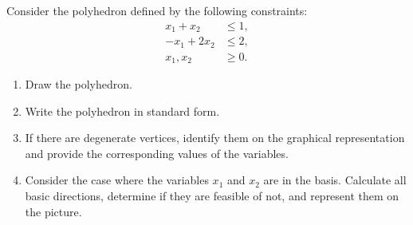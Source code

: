 Consider the polyhedron defined by the following constraints:
\begin{align*}
x_1+x_2 &\leq 1,\\
-x_1+2x_2 &\leq 2,\\
x_1,x_2 & \geq 0.
\end{align*}

\begin{enumerate}
\item Draw the polyhedron.
\item Write the polyhedron in standard form.
\item If there are degenerate vertices, identify them on the graphical
  representation and provide the corresponding values of the
  variables.
\item  Consider the case where the  variables  $x_1$ and $x_2$ are in the basis.
Calculate all basic directions, determine if they are feasible of not, and
represent them on the picture.
\end{enumerate}



